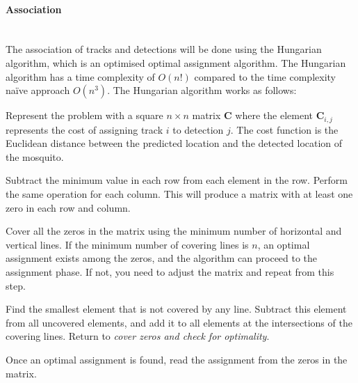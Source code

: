 \paragraph{Association}\mbox{}\\
The association of tracks and detections will be done using the Hungarian algorithm, which is an optimised optimal assignment algorithm. The Hungarian algorithm has a time complexity of $O\left(n!\right)$ compared to the time complexity na\"ive approach $O\left(n^3\right)$. The Hungarian algorithm works as follows:
\begin{description}[style=nextline]
  \item[Generate a cost matrix.] Represent the problem with a square $n \times n$ matrix $\mathbf{C}$ where the element $\mathbf{C}_{i,j}$ represents the cost of assigning track $i$ to detection $j$. The cost function is the Euclidean distance between the predicted location and the detected location of the mosquito.
  \item[Row and column reduction.] Subtract the minimum value in each row from each element in the row. Perform the same operation for each column. This will produce a matrix with at least one zero in each row and column.
  \item[Cover zeros and check for optimality.] Cover all the zeros in the matrix using the minimum number of horizontal and vertical lines. If the minimum number of covering lines is $n$, an optimal assignment exists among the zeros, and the algorithm can proceed to the assignment phase. If not, you need to adjust the matrix and repeat from this step.
  \item[Adjust the matrix.] Find the smallest element that is not covered by any line. Subtract this element from all uncovered elements, and add it to all elements at the intersections of the covering lines. Return to \textit{cover zeros and check for optimality}.
  \item[Assignment.] Once an optimal assignment is found, read the assignment from the zeros in the matrix.
\end{description}



